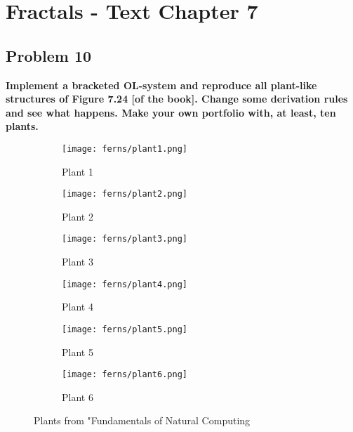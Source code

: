 
\chapter{Fractals - Text Chapter 7}

\section{Problem 10}
\textbf{ Implement a bracketed OL-system and reproduce all plant-like structures of Figure 7.24 [of the book]. Change some derivation rules and see what happens. Make your own portfolio with, at least, ten plants. }

\begin{figure}[tbh]
\begin{center}
	\begin{subfigure}[tbh]{0.3\textwidth}
	\begin{center}
	\texttt{[image: ferns/plant1.png]}
	\caption{Plant 1}
	\end{center}
	\end{subfigure}
\hfill
	\begin{subfigure}[tbh]{0.3\textwidth}
	\begin{center}
	\texttt{[image: ferns/plant2.png]}
	\caption{Plant 2}
	\end{center}
	\end{subfigure}
\hfill
	\begin{subfigure}[tbh]{0.3\textwidth}
	\begin{center}
	\texttt{[image: ferns/plant3.png]}
	\caption{Plant 3}
	\end{center}
	\end{subfigure}
\hfill
	\begin{subfigure}[tbh]{0.3\textwidth}
	\begin{center}
	\texttt{[image: ferns/plant4.png]}
	\caption{Plant 4}
	\end{center}
	\end{subfigure}
\hfill
	\begin{subfigure}[tbh]{0.3\textwidth}
	\begin{center}
	\texttt{[image: ferns/plant5.png]}
	\caption{Plant 5}
	\end{center}
	\end{subfigure}
\hfill
	\begin{subfigure}[tbh]{0.3\textwidth}
	\begin{center}
	\texttt{[image: ferns/plant6.png]}
	\caption{Plant 6}
	\end{center}
	\end{subfigure}
\hfill
\end{center}
\caption{ Plants from "Fundamentals of Natural Computing}
\end{figure} \label{bookPlants}

